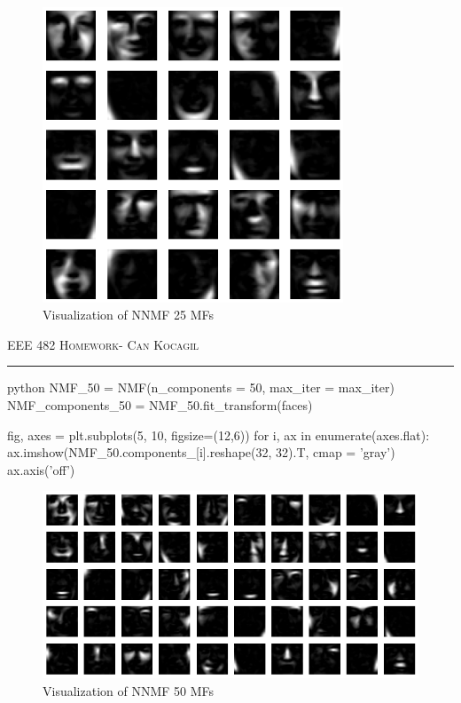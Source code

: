 \documentclass[12pt]{amsart}
\begin{document}
\begin{figure}[h]
    \centering
        \includegraphics[width = 0.8\textwidth]{images/Q1/NMF_25_components.png}
        \caption{Visualization of NNMF 25 MFs}
\end{figure}


\newpage
{\scshape EEE 482} \hfill {\scshape \large  Homework-\relax} \hfill {\scshape Can Kocagil}
\smallskip
\hrule
\vspace{2mm}

\begin{mintedbox}{python}
NMF_50 = NMF(n_components = 50, max_iter = max_iter)
NMF_components_50 = NMF_50.fit_transform(faces)


fig, axes = plt.subplots(5, 10, figsize=(12,6))
for i, ax in enumerate(axes.flat):
    ax.imshow(NMF_50.components_[i].reshape(32, 32).T, cmap = 'gray')
    ax.axis('off')
\end{mintedbox}

\begin{figure}[h]
    \centering
        \includegraphics[width = 1\textwidth]{images/Q1/NMF_50_components.png}
        \caption{Visualization of NNMF 50 MFs}
\end{figure}
\end{document}

